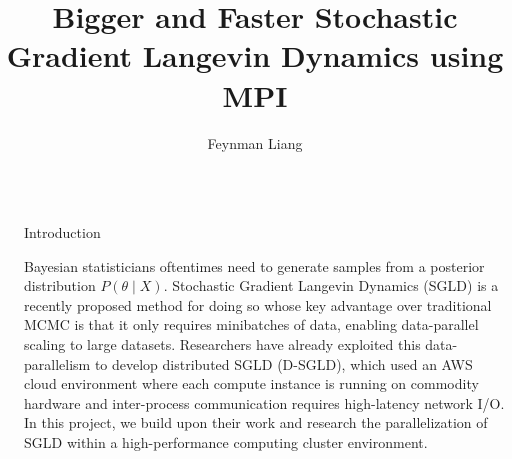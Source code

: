\documentclass[final]{beamer}
\title{Bigger and Faster Stochastic Gradient Langevin Dynamics using MPI} %
\author{Feynman Liang} %
\institute{CS 267, UC Berkeley} %
\newlength{\sepwid}
\newlength{\onecolwid}
\begin{document}

\setlength{\belowcaptionskip}{2ex} %
\setlength\belowdisplayshortskip{2ex} %

\begin{frame}[t] %

\begin{columns}[t] %

\begin{column}{\sepwid}\end{column} %

\begin{column}{\onecolwid} %



\begin{block}{Introduction}

  Bayesian statisticians oftentimes need to generate samples from a
  posterior distribution $P(\theta \mid X)$.
  Stochastic Gradient Langevin Dynamics (SGLD) \citep{welling2011bayesian} is
  a recently proposed method for doing so whose key advantage over traditional MCMC
  is that it only requires minibatches of data, enabling data-parallel scaling
  to large datasets. Researchers \citep{ahn2014distributed}
  have already exploited this data-parallelism to develop distributed SGLD (D-SGLD),
  which used an AWS cloud environment where each compute instance is running on
  commodity hardware and inter-process communication requires high-latency
  network I/O. In this project, we build upon their work and research the
  parallelization of SGLD within a high-performance computing cluster
  environment.



\end{block}
\end{column}
\end{columns}
\end{frame}
\end{document}
